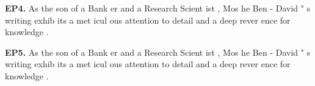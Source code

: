 \begin{mdframed}
\textbf{EP4.} \textcolor{Gray0}{As} \textcolor{Gray0}{the} \textcolor{Gray0}{son} \textcolor{Gray0}{of} \textcolor{Gray0}{a} \textcolor{Gray0}{Bank} \textcolor{Gray0}{er} \textcolor{Gray0}{and} \textcolor{Gray0}{a} \textcolor{Gray0}{Research} \textcolor{Gray0}{Scient} \textcolor{Gray0}{ist} \textcolor{Gray0}{,} \textcolor{Gray0}{Mos} \textcolor{Gray0}{he} \textcolor{Gray0}{Ben} \textcolor{Gray0}{-} \textcolor{Gray0}{David} \textcolor{Gray0}{"} \textcolor{Gray0}{s} \textcolor{Gray0}{writing} \textcolor{Gray0}{exhib} \textcolor{Gray0}{its} \textcolor{Gray0}{a} \textcolor{Gray0}{met} \textcolor{Gray0}{icul} \textcolor{Gray0}{ous} \textcolor{Gray0}{attention} \textcolor{Gray0}{to} \textcolor{Gray0}{detail} \textcolor{Gray0}{and} \textcolor{Gray0}{a} \textcolor{Gray0}{deep} \textcolor{Gray0}{rever} \textcolor{Gray0}{ence} \textcolor{Gray0}{for} \textcolor{Gray0}{knowledge} \textcolor{Gray0}{.} 

\textbf{EP5.} \textcolor{Gray0}{As} \textcolor{Gray0}{the} \textcolor{Gray0}{son} \textcolor{Gray0}{of} \textcolor{Gray0}{a} \textcolor{Gray0}{Bank} \textcolor{Gray0}{er} \textcolor{Gray0}{and} \textcolor{Gray0}{a} \textcolor{Gray0}{Research} \textcolor{Gray0}{Scient} \textcolor{Gray0}{ist} \textcolor{Gray0}{,} \textcolor{Gray0}{Mos} \textcolor{Gray0}{he} \textcolor{Gray0}{Ben} \textcolor{Gray0}{-} \textcolor{Gray0}{David} \textcolor{Gray0}{"} \textcolor{Gray0}{s} \textcolor{Gray0}{writing} \textcolor{Gray0}{exhib} \textcolor{Gray0}{its} \textcolor{Gray0}{a} \textcolor{Gray0}{met} \textcolor{Gray0}{icul} \textcolor{Gray0}{ous} \textcolor{Gray0}{attention} \textcolor{Gray0}{to} \textcolor{Gray0}{detail} \textcolor{Gray0}{and} \textcolor{Gray0}{a} \textcolor{Gray0}{deep} \textcolor{Gray0}{rever} \textcolor{Gray0}{ence} \textcolor{Gray0}{for} \textcolor{Gray0}{knowledge} \textcolor{Gray0}{.} 
\end{mdframed}
\clearpage
